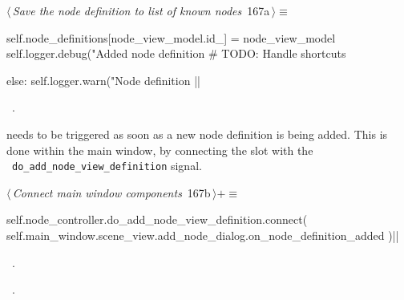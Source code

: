 \documentclass[%
    a4paper,    %
    justified,  %
    nobib,      %
    openany     %
]{tufte-book}
\makeatletter
\renewcommand{\label}[1]{\@tufte@label{##1}}%
\makeatother
\begin{document}
\begin{flushleft} \small
\begin{minipage}{\linewidth}\label{scrap164}\raggedright\small
{} $\langle\,${\itshape Save the node definition to list of known nodes}\nobreak\ {\footnotesize {167a}}$\,\rangle\equiv$
\vspace{-1ex}
\begin{pythoncode}
    self.node_definitions[node_view_model.id_] = node_view_model
    self.logger.debug("Added node definition %
    # TODO: Handle shortcuts

else:
    self.logger.warn("Node definition %
|\NWsep|
\end{pythoncode}
\vspace{1.5ex}
\footnotesize
\begin{list}{}{\setlength{\itemsep}{-\parsep}\setlength{\itemindent}{-\leftmargin}}
\item \NWtxtMacroRefIn\ .

\item{}
\end{list}
\end{minipage}\vspace{4ex}
\end{flushleft}
 needs to be triggered as soon as a new node
definition is being added. This is done within the main window, by connecting
the slot with the ~\verb=do_add_node_view_definition= signal.

\begin{flushleft} \small
\begin{minipage}{\linewidth}\label{scrap165}\raggedright\small
{} $\langle\,${\itshape Connect main window components}\nobreak\ {\footnotesize {167b}}$\,\rangle+\equiv$
\vspace{-1ex}
\begin{pythoncode}
self.node_controller.do_add_node_view_definition.connect(
    self.main_window.scene_view.add_node_dialog.on_node_definition_added
)|\NWsep|
\end{pythoncode}
\vspace{1.5ex}
\footnotesize
\begin{list}{}{\setlength{\itemsep}{-\parsep}\setlength{\itemindent}{-\leftmargin}}
\item \NWtxtMacroDefBy\ .
\item \NWtxtMacroRefIn\ .

\item{}
\end{list}
\end{minipage}\vspace{4ex}
\end{flushleft}
\end{document}
